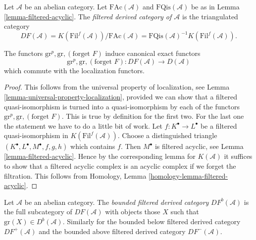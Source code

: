 \begin{definition}
\label{definition-filtered-derived}
Let $\mathcal{A}$ be an abelian category.
Let $\text{FAc}(\mathcal{A})$ and $\text{FQis}(\mathcal{A})$
be as in
Lemma \ref{lemma-filtered-acyclic}.
The {\it filtered derived category of $\mathcal{A}$}
is the triangulated category
$$
DF(\mathcal{A}) =
K(\text{Fil}^f(\mathcal{A}))/\text{FAc}(\mathcal{A}) =
\text{FQis}(\mathcal{A})^{-1} K(\text{Fil}^f(\mathcal{A})).
$$
\end{definition}

\begin{lemma}
\label{lemma-filtered-derived-functors}
The functors $\text{gr}^p, \text{gr}, (\text{forget }F)$ induce
canonical exact functors
$$
\text{gr}^p, \text{gr}, (\text{forget }F):
DF(\mathcal{A})
\longrightarrow
D(\mathcal{A})
$$
which commute with the localization functors.
\end{lemma}

\begin{proof}
This follows from the universal property of localization, see
Lemma \ref{lemma-universal-property-localization},
provided we can show that a filtered quasi-isomorphism is turned
into a quasi-isomorphism by each of the functors
$\text{gr}^p, \text{gr}, (\text{forget }F)$. This is true by definition
for the first two. For the last one the statement we have to do a little
bit of work. Let $f : K^\bullet \to L^\bullet$ be a filtered
quasi-isomorphism in $K(\text{Fil}^f(\mathcal{A}))$.
Choose a distinguished triangle $(K^\bullet, L^\bullet, M^\bullet, f, g, h)$
which contains $f$. Then $M^\bullet$ is filtered acyclic, see
Lemma \ref{lemma-filtered-acyclic}.
Hence by the corresponding lemma for $K(\mathcal{A})$ it suffices
to show that a filtered acyclic complex is an acyclic complex if
we forget the filtration.
This follows from
Homology, Lemma \ref{homology-lemma-filtered-acyclic}.
\end{proof}

\begin{definition}
\label{definition-filtered-derived-bounded}
Let $\mathcal{A}$ be an abelian category.
The {\it bounded filtered derived category} $DF^b(\mathcal{A})$ is
the full subcategory of $DF(\mathcal{A})$ with objects those $X$
such that $\text{gr}(X) \in D^b(\mathcal{A})$.
Similarly for the bounded below filtered derived category
$DF^{+}(\mathcal{A})$ and the bounded above filtered derived category
$DF^{-}(\mathcal{A})$.
\end{definition}

